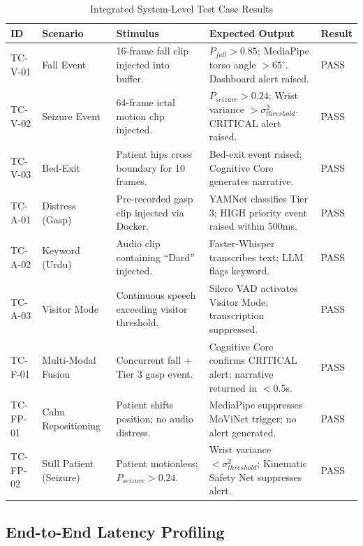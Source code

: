 \begin{table}[H]
    \centering
    \caption{Integrated System-Level Test Case Results}
    \label{tab:system_tests}
    \renewcommand{\arraystretch}{1.3}
    \begin{tabular}{|p{1.5cm}|p{2.5cm}|p{3cm}|p{3.5cm}|p{1.3cm}|}
    \hline
    \textbf{ID} & \textbf{Scenario} & \textbf{Stimulus} & \textbf{Expected Output} & \textbf{Result} \\ \hline
    TC-V-01 & Fall Event & 16-frame fall clip injected into buffer. & $P_{fall} > 0.85$; MediaPipe torso angle $> 65^{\circ}$. Dashboard alert raised. & PASS \\ \hline
    TC-V-02 & Seizure Event & 64-frame ictal motion clip injected. & $P_{seizure} > 0.24$; Wrist variance $> \sigma^2_{threshold}$. CRITICAL alert raised. & PASS \\ \hline
    TC-V-03 & Bed-Exit & Patient hips cross boundary for 10 frames. & Bed-exit event raised; Cognitive Core generates narrative. & PASS \\ \hline
    TC-A-01 & Distress (Gasp) & Pre-recorded gasp clip injected via Docker. & YAMNet classifies Tier 3; HIGH priority event raised within 500ms. & PASS \\ \hline
    TC-A-02 & Keyword (Urdu) & Audio clip containing ``Dard'' injected. & Faster-Whisper transcribes text; LLM flags keyword. & PASS \\ \hline
    TC-A-03 & Visitor Mode & Continuous speech exceeding visitor threshold. & Silero VAD activates Visitor Mode; transcription suppressed. & PASS \\ \hline
    TC-F-01 & Multi-Modal Fusion & Concurrent fall + Tier 3 gasp event. & Cognitive Core confirms CRITICAL alert; narrative returned in $<$0.5s. & PASS \\ \hline
    TC-FP-01 & Calm Repositioning & Patient shifts position; no audio distress. & MediaPipe suppresses MoViNet trigger; no alert generated. & PASS \\ \hline
    TC-FP-02 & Still Patient (Seizure) & Patient motionless; $P_{seizure} > 0.24$. & Wrist variance $< \sigma^2_{threshold}$; Kinematic Safety Net suppresses alert. & PASS \\ \hline
    \end{tabular}
\end{table}

\subsection{End-to-End Latency Profiling}

